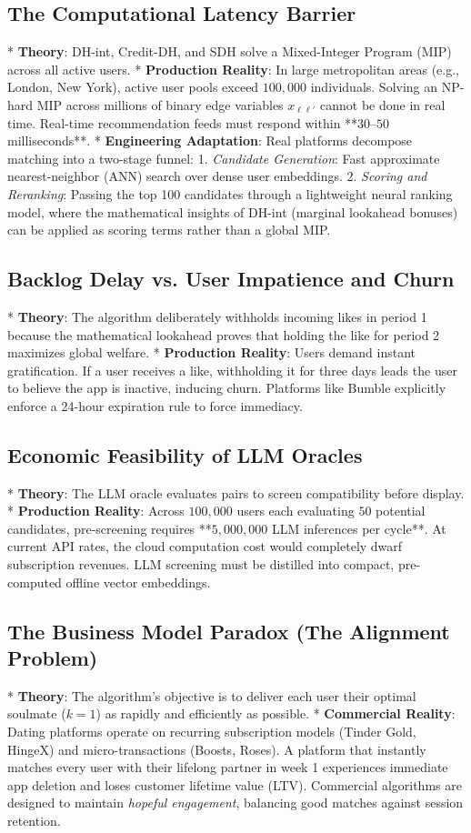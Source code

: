 \documentclass[11pt,letterpaper]{article}
\theoremstyle{definition}
\theoremstyle{plain}
\theoremstyle{remark}
\begin{document}
\subsection{The Computational Latency Barrier}
* \textbf{Theory}: DH-int, Credit-DH, and SDH solve a Mixed-Integer Program (MIP) across all active users.
* \textbf{Production Reality}: In large metropolitan areas (e.g., London, New York), active user pools exceed $100,000$ individuals. Solving an NP-hard MIP across millions of binary edge variables $x_{\ell\ell'}$ cannot be done in real time. Real-time recommendation feeds must respond within **$30\text{--}50$ milliseconds**.
* \textbf{Engineering Adaptation}: Real platforms decompose matching into a two-stage funnel:
  1. \emph{Candidate Generation}: Fast approximate nearest-neighbor (ANN) search over dense user embeddings.
  2. \emph{Scoring and Reranking}: Passing the top 100 candidates through a lightweight neural ranking model, where the mathematical insights of DH-int (marginal lookahead bonuses) can be applied as scoring terms rather than a global MIP.

\subsection{Backlog Delay vs. User Impatience and Churn}
* \textbf{Theory}: The algorithm deliberately withholds incoming likes in period 1 because the mathematical lookahead proves that holding the like for period 2 maximizes global welfare.
* \textbf{Production Reality}: Users demand instant gratification. If a user receives a like, withholding it for three days leads the user to believe the app is inactive, inducing churn. Platforms like Bumble explicitly enforce a 24-hour expiration rule to force immediacy.

\subsection{Economic Feasibility of LLM Oracles}
* \textbf{Theory}: The LLM oracle evaluates pairs to screen compatibility before display.
* \textbf{Production Reality}: Across $100,000$ users each evaluating $50$ potential candidates, pre-screening requires **$5,000,000$ LLM inferences per cycle**. At current API rates, the cloud computation cost would completely dwarf subscription revenues. LLM screening must be distilled into compact, pre-computed offline vector embeddings.

\subsection{The Business Model Paradox (The Alignment Problem)}
* \textbf{Theory}: The algorithm's objective is to deliver each user their optimal soulmate ($k=1$) as rapidly and efficiently as possible.
* \textbf{Commercial Reality}: Dating platforms operate on recurring subscription models (Tinder Gold, HingeX) and micro-transactions (Boosts, Roses). A platform that instantly matches every user with their lifelong partner in week 1 experiences immediate app deletion and loses customer lifetime value (LTV). Commercial algorithms are designed to maintain \emph{hopeful engagement}, balancing good matches against session retention.
\end{document}
